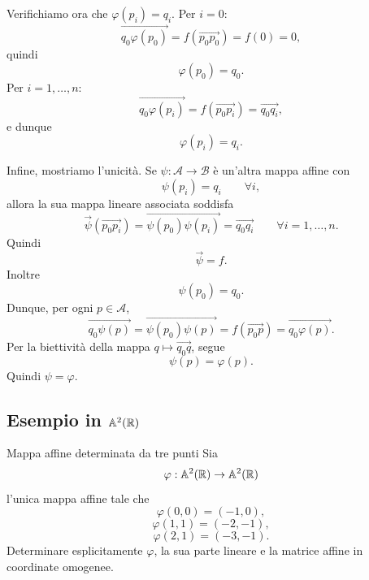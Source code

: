 \documentclass[a4paper]{article}
\begin{document}
\begin{snippetproof}{}
    Verifichiamo ora che \(\varphi(p_i)=q_i\). Per \(i=0\):
    \[
        \overrightarrow{q_0\varphi(p_0)}
        =
        f(\overrightarrow{p_0p_0})
        =
        f(0)=0,
    \]
    quindi
    \[
        \varphi(p_0)=q_0.
    \]
    Per \(i=1,\ldots,n\):
    \[
        \overrightarrow{q_0\varphi(p_i)}
        =
        f(\overrightarrow{p_0p_i})
        =
        \overrightarrow{q_0q_i},
    \]
    e dunque
    \[
        \varphi(p_i)=q_i.
    \]

    Infine, mostriamo l'unicità. Se \(\psi:\mathcal{A}\to\mathcal{B}\) è un'altra mappa affine con
    \[
        \psi(p_i)=q_i
        \qquad
        \forall i,
    \]
    allora la sua mappa lineare associata soddisfa
    \[
        \overrightarrow{\psi}(\overrightarrow{p_0p_i})
        =
        \overrightarrow{\psi(p_0)\psi(p_i)}
        =
        \overrightarrow{q_0q_i}
        \qquad
        \forall i=1,\ldots,n.
    \]
    Quindi
    \[
        \overrightarrow{\psi}=f.
    \]
    Inoltre
    \[
        \psi(p_0)=q_0.
    \]
    Dunque, per ogni \(p\in\mathcal{A}\),
    \[
        \overrightarrow{q_0\psi(p)}
        =
        \overrightarrow{\psi(p_0)\psi(p)}
        =
        f(\overrightarrow{p_0p})
        =
        \overrightarrow{q_0\varphi(p)}.
    \]
    Per la biettività della mappa \(q\mapsto\overrightarrow{q_0q}\), segue
    \[
        \psi(p)=\varphi(p).
    \]
    Quindi \(\psi=\varphi\).
\end{snippetproof}

\subsection{Esempio in \(\mathbb{A}^2(\mathbb{R})\)}

\begin{snippetexercise}{Mappa affine determinata da tre punti}
    Sia
    \[
        \varphi:\mathbb{A}^2(\mathbb{R})\to\mathbb{A}^2(\mathbb{R})
    \]
    l'unica mappa affine tale che
    \[
        \varphi(0,0)=(-1,0),
    \]
    \[
        \varphi(1,1)=(-2,-1),
    \]
    \[
        \varphi(2,1)=(-3,-1).
    \]
    Determinare esplicitamente \(\varphi\), la sua parte lineare e la matrice affine in coordinate omogenee.
\end{snippetexercise}
\end{document}
